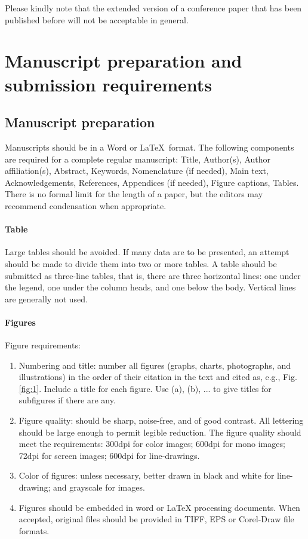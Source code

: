 \documentclass[review]{fcs}
\begin{document}
Please kindly note that the extended version of a conference paper that has been published before will not be acceptable in general.

\section{Manuscript preparation and submission requirements}
\subsection{Manuscript preparation}

Manuscripts should be in a Word or \LaTeX\ format. The following components are required for a complete regular manu\-script: Title, Author(s), Author affiliation(s), Abstract, Keywords, Nomenclature (if needed), Main text, Acknowledgements, References, Appendices (if needed), Figure captions, Tables. There is no formal limit for the length of a paper, but the editors may recommend condensation when appropriate. 

\paragraph{Table}

Large tables should be avoided. If many data are to be presented, an attempt should be made to divide them into two or more tables.
A table should be submitted as three-line tables, that is, there are three horizontal lines: one under the legend, one under the column heads, and one below the body. Vertical lines are generally not used.


\paragraph{Figures}

Figure requirements:
\begin{enumerate}[leftmargin=0pt,itemindent=2em,label=\arabic*)]
\item Numbering and title: number all figures (graphs, charts, photographs, and illustrations) in the order of their citation in the text and cited as, e.g., Fig. \ref{fig:1}. Include a title for each figure. Use (a), (b), ... to give titles for subfigures if there are any.
\item Figure quality: should be sharp, noise-free, and of good contrast. All lettering should be large enough to permit legible reduction. The figure quality should meet the requirements: 300dpi for color images; 600dpi for mono images; 72dpi for screen images; 600dpi for line-drawings.
\item Color of figures: unless necessary, better drawn in black and white for line-drawing; and grayscale for images.
\item Figures should be embedded in word or LaTeX processing documents. When accepted, original files should be provided in TIFF, EPS or Corel-Draw file formats.
\end{enumerate}
\end{document}
